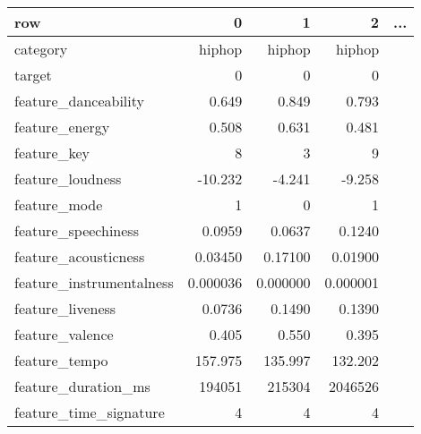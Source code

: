 \begin{table}[H]
    \begin{tabular}{l|rrrr}

    \toprule
    row & 0 & 1 & 2 & ... \\
    \midrule
    category & hiphop & hiphop & hiphop \\
    target & 0 & 0 & 0 \\
    feature\_danceability & 0.649 & 0.849 & 0.793 \\
    feature\_energy & 0.508 & 0.631 & 0.481 \\
    feature\_key & 8 & 3 & 9 \\
    feature\_loudness & -10.232 & -4.241 & -9.258 \\
    feature\_mode & 1 & 0 & 1 \\
    feature\_speechiness & 0.0959 & 0.0637 & 0.1240 \\
    feature\_acousticness & 0.03450 & 0.17100 & 0.01900 \\
    feature\_instrumentalness & 0.000036 & 0.000000 & 0.000001 \\
    feature\_liveness & 0.0736 & 0.1490 & 0.1390 \\
    feature\_valence & 0.405 & 0.550 & 0.395 \\
    feature\_tempo & 157.975 & 135.997 & 132.202 \\
    feature\_duration\_ms & 194051 & 215304 & 2046526 \\
    feature\_time\_signature & 4 & 4 & 4 \\
    \bottomrule
%

\end{tabular}
\end{table}
